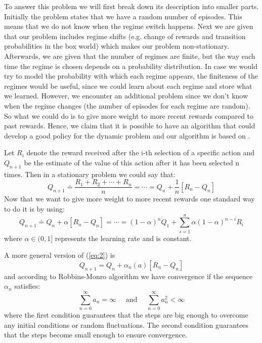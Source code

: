 \documentclass{article}
\begin{document}

To answer this problem we will first break down its description into smaller parts. Initially the problem states that we have a random number of episodes. This means that we do not know when the regime switch happens. Next we are given that our problem includes regime shifts (e.g. change of rewards and transition probabilities in the box world) which makes our problem non-stationary. Afterwards, we are given that the number of regimes are finite, but the way each time the regime is chosen depends on a probability distribution. In case we would try to model the probability with which each regime appears, the finiteness of the regimes would be useful, since we could learn about each regime and store what we learned. However, we encounter an additional problem since we don't know when the regime changes (the number of episodes for each regime are random). So what we could do is to give more weight to more recent rewards compared to past rewards. Hence, we claim that it is possible to have an algorithm that could develop a good policy for the dynamic problem and our algorithm is based on \cite{Sutton:1998}.

Let $R_{i}$ denote the reward received after the i-th selection of a specific action and $Q_{n+1}$ be the estimate of the value of this action after it has been selected n times. Then in a stationary problem we could say that:
\begin{equation}
    Q_{n+1} \doteq \frac{R_{1}+R_{2}+\cdots+R_{n}}{n} = \cdots = Q_{n}+\frac{1}{n}\left[R_{n}-Q_{n}\right]
    \label{eq:1}
\end{equation}
Now that we want to give more weight to more recent rewards one standard way to do it is by using:
\begin{equation}
    Q_{n+1} \doteq Q_{n}+\alpha\left[R_{n}-Q_{n}\right] = \cdots = (1-\alpha)^{n} Q_{1}+\sum_{i=1}^{n} \alpha(1-\alpha)^{n-i} R_{i}
    \label{eq:2}
\end{equation}
where $\alpha \in(0,1]$ represents the learning rate and is constant. 

A more general version of (\ref{eq:2}) is
\begin{equation}
    Q_{n+1}=Q_{n}+\alpha_{n}(a)\left[R_{n}-Q_{n}\right]
\end{equation}
and according to Robbins-Monro algorithm we have convergence if the sequence $\alpha_{n}$ satisfies:
\begin{equation}
    \sum_{n=0}^{\infty} a_{n}=\infty \quad \text { and } \quad \sum_{n=0}^{\infty} a_{n}^{2}<\infty
    \label{eq:4}
\end{equation}
where the first condition guarantees that the steps are big enough to overcome any initial conditions or random fluctuations. The second condition guarantees that the steps become small enough to ensure convergence.
\end{document}

